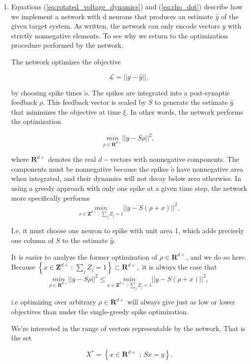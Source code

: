 \begin{enumerate}
\clearpage


\item Equations (\ref{eq:rotated_voltage_dynamics}) and (\ref{eq:rho_dot}) describe how we implement a network with d neurons that produces an estimate $\hat{y}$ of the given target system. As written, the network can only encode vectors $y$ with strictly nonnegative elements. To see why we return to the optimization procedure performed by the network. 

The network optimizes the objective 

$$
\mathcal{L} = || y - \hat{y}||,
$$

by choosing spike times $\tilde{o}$. The spikes are integrated into a post-synaptic feedback $\rho$. This feedback vector is scaled by $S$ to generate the estimate $\hat{y}$ that minimizes the objective at time $\xi$.  In other words, the network performs the optimization

$$
\underset{\rho \in \mathbf{R}^{d+}}{min} ||y - S \rho ||^2,
$$

where $\mathbf{R}^{d+}$ denotes the real $d-$vectors with nonnegative components. The components must be nonnegative because the spikes $\tilde{o}$ have nonnegative area when integrated, and their dynamics will not decay below zero otherwise. In using a greedy approach with only one spike at a given time step, the network more specifically performs 
$$
\underset{x \in \mathbf{Z}^{d+} \, : \, \sum_j Z_j = 1}{min} ||y - S \left( \rho + x\right) ||^2.
$$

I.e, it must choose one neuron to spike with unit area 1, which adds precisely one column of $S$ to the estimate $\hat{y}$. 

It is easier to analyze the former optimization of $\rho \in \mathbf{R}^{d+}$, and we do so here. Because $ \left\{x \in \mathbf{Z}^{d+} \, : \, \sum_j Z_j = 1 \right\} \subset \mathbf{R}^{d+},$ it is always the case that 
$$
\underset{\rho \in \mathbf{R}^{d+}}{min} ||y - S \rho ||^2
\leq \underset{x \in \mathbf{Z}^{d+} \, : \, \sum_j Z_j = 1}{min} ||y - S \left( \rho + x\right) ||^2,
$$

i.e optimizing over arbitrary $ \rho \in \mathbf{R}^{d+}$ will always give just as low or lower objectives than under the single-greedy spike optimization.

We're interested in the range of vectors representable by the network.  That is the set

$$
X^* = \left\{x \in  \mathbf{R}^{d+} \, \ : \, Sx = y \right\}.
$$



\end{enumerate}
